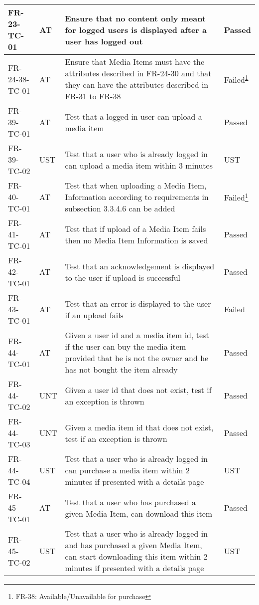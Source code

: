 \documentclass[../report.tex]{subfiles}
\newcommand{\footnoteref}[1]{\textsuperscript{\ref{#1}}}
\begin{document}
\begin{longtable}{|L{2.1cm}|L{1cm}|L{12.4cm}|L{1.4cm}|}
FR-23-TC-01&AT&Ensure that no content only meant for logged users is displayed after a user has logged out&Passed  \\ \hline
FR-24-38-TC-01&AT&Ensure that Media Items must have the attributes described in FR-24-30 and that they can have the attributes described in FR-31 to FR-38&Failed\footnoteref{note1}  \\ \hline
FR-39-TC-01&AT&Test that a logged in user can upload a media item&Passed  \\ \hline
FR-39-TC-02&UST&Test that a user who is already logged in can upload a media item within 3 minutes&UST  \\ \hline
FR-40-TC-01&AT&Test that when uploading a Media Item, Information according to requirements in subsection 3.3.4.6 can be added&Failed\footnote{\label{note1} FR-38: Available/Unavailable for purchase}  \\ \hline
FR-41-TC-01&AT&Test that if upload of a Media Item fails then no Media Item Information is saved&Passed  \\ \hline
FR-42-TC-01&AT&Test that an acknowledgement is displayed to the user if upload is successful&Passed  \\ \hline
FR-43-TC-01&AT&Test that an error is displayed to the user if an upload fails&Failed  \\ \hline
FR-44-TC-01&AT&Given a user id and a media item id, test if the user can buy the media item provided that he is not the owner and he has not bought the item already&Passed  \\ \hline
FR-44-TC-02&UNT&Given a user id that does not exist, test if an exception is thrown&Passed  \\ \hline
FR-44-TC-03&UNT&Given a media item id that does not exist, test if an exception is thrown&Passed  \\ \hline
FR-44-TC-04&UST&Test that a user who is already logged in can purchase a media item within 2 minutes if presented with a details page&UST  \\ \hline
FR-45-TC-01&AT&Test that a user who has purchased a given Media Item, can download this item&Passed  \\ \hline
FR-45-TC-02&UST&Test that a user who is already logged in and has purchased a given Media Item, can start downloading this item within 2 minutes if presented with a details page&UST  \\ \hline

\end{longtable}
\end{document}
